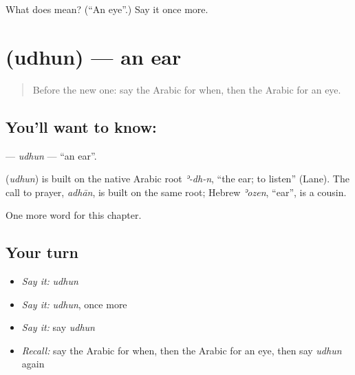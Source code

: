 \begin{tcolorbox}[breakable,colback=teal!4,colframe=teal!35!black,title={Before you move on}]
What does  mean? (\textquotedblleft{}An eye\textquotedblright{}.) Say it once more.
\end{tcolorbox}
\section[\texorpdfstring{\ar{أذن} (udhun)}{أذن (udhun)}]{ (udhun) — an ear}

\label{lesson:AR-C50-udhun}



\begin{quote}
Before the new one: say the Arabic for when, then the Arabic for an eye.
\end{quote}

\subsection*{You'll want to know: }
\textbf{} — \emph{udhun} — \textquotedblleft{}an ear\textquotedblright{}.

\begin{cousinweb}
\textbf{} (\emph{udhun}) is built on the native Arabic root \emph{ʾ-dh-n}, \textquotedblleft{}the ear; to listen\textquotedblright{} (Lane). The call to prayer, \emph{adhān}, is built on the same root; Hebrew \emph{ʾozen}, \textquotedblleft{}ear\textquotedblright{}, is a cousin.
\end{cousinweb}

\begin{grammarlens}[title={What you've built}]
One more word for this chapter.
\end{grammarlens}

\subsection*{Your turn}
\begin{itemize}
\raggedright
  \item \emph{Say it:} \emph{udhun}
  \item \emph{Say it:} \emph{udhun}, once more
  \item \emph{Say it:} say \emph{udhun}
  \item \emph{Recall:} say the Arabic for when, then the Arabic for an eye, then say \emph{udhun} again
\end{itemize}

